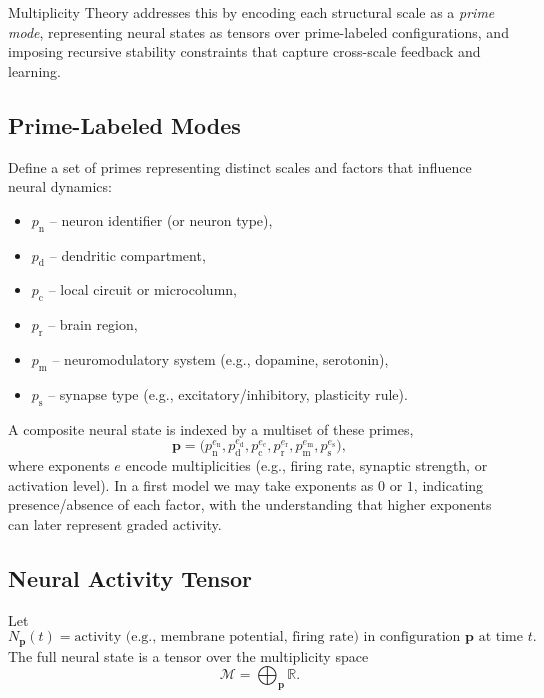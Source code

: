 \documentclass[11pt]{article}
\begin{document}
Multiplicity Theory addresses this by encoding each structural scale as a \emph{prime mode}, representing neural states as tensors over prime-labeled configurations, and imposing recursive stability constraints that capture cross-scale feedback and learning.

\subsection{Prime-Labeled Modes}
Define a set of primes representing distinct scales and factors that influence neural dynamics:
\begin{itemize}
    \item $p_{\text{n}}$ -- neuron identifier (or neuron type),
    \item $p_{\text{d}}$ -- dendritic compartment,
    \item $p_{\text{c}}$ -- local circuit or microcolumn,
    \item $p_{\text{r}}$ -- brain region,
    \item $p_{\text{m}}$ -- neuromodulatory system (e.g., dopamine, serotonin),
    \item $p_{\text{s}}$ -- synapse type (e.g., excitatory/inhibitory, plasticity rule).
\end{itemize}
A composite neural state is indexed by a multiset of these primes,
\[
\mathbf{p}
=
\big(
p_{\text{n}}^{e_{\text{n}}},
p_{\text{d}}^{e_{\text{d}}},
p_{\text{c}}^{e_{\text{c}}},
p_{\text{r}}^{e_{\text{r}}},
p_{\text{m}}^{e_{\text{m}}},
p_{\text{s}}^{e_{\text{s}}}
\big),
\]
where exponents $e$ encode multiplicities (e.g., firing rate, synaptic strength, or activation level). In a first model we may take exponents as $0$ or $1$, indicating presence/absence of each factor, with the understanding that higher exponents can later represent graded activity.

\subsection{Neural Activity Tensor}
Let
\[
N_{\mathbf{p}}(t)
=
\text{activity (e.g., membrane potential, firing rate) in configuration }
\mathbf{p}
\text{ at time } t.
\]
The full neural state is a tensor over the multiplicity space
\[
\mathcal{M} = \bigoplus_{\mathbf{p}} \mathbb{R}.
\]
\end{document}
